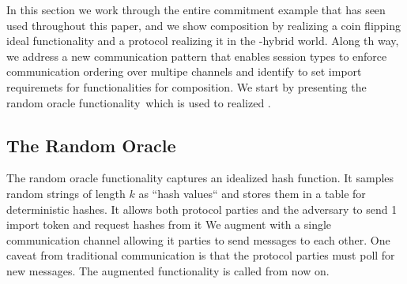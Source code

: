 In this section we work through the entire commitment example that has seen used throughout this paper, and we show composition by realizing a coin flipping ideal functionality \Fflip and a protocol realizing it in the \Fcom-hybrid world.
Along th way, we address a new communication pattern that enables session types to enforce communication ordering over multipe channels and identify to set import requiremets for functionalities for composition.
We start by presenting the random oracle functionality~\Fro which is used to realized \Fcom.

\subsection{The Random Oracle}
The random oracle functionality captures an idealized hash function. It samples random strings of length $k$ as ``hash values`` and stores them in a table for deterministic hashes.
It allows both protocol parties and the adversary to send 1 import token and request hashes from it
We augment \Fro with a single communication channel allowing it parties to send messages to each other. One caveat from traditional communication
is that the protocol parties must poll \Fro for new messages. The augmented functionality is called \Fropp from now on.

